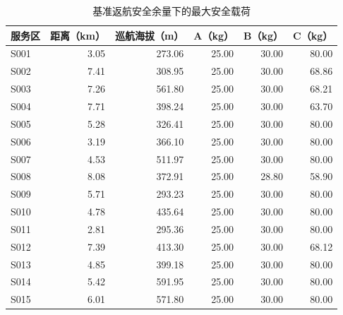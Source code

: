 \begin{table}[!htbp]
\centering
\caption{基准返航安全余量下的最大安全载荷}
\label{tab:q1-payload}
\small
\setlength{\tabcolsep}{4pt}
\renewcommand{\arraystretch}{1.10}
\begin{tabular}{@{}lrrrrr@{}}
\toprule
服务区 & 距离（km） & 巡航海拔（m） & A（kg） & B（kg） & C（kg） \\
\midrule
S001 & 3.05 & 273.06 & 25.00 & 30.00 & 80.00 \\
S002 & 7.41 & 308.95 & 25.00 & 30.00 & 68.86 \\
S003 & 7.26 & 561.80 & 25.00 & 30.00 & 68.21 \\
S004 & 7.71 & 398.24 & 25.00 & 30.00 & 63.70 \\
S005 & 5.28 & 326.41 & 25.00 & 30.00 & 80.00 \\
S006 & 3.19 & 366.10 & 25.00 & 30.00 & 80.00 \\
S007 & 4.53 & 511.97 & 25.00 & 30.00 & 80.00 \\
S008 & 8.08 & 372.91 & 25.00 & 28.80 & 58.90 \\
S009 & 5.71 & 293.23 & 25.00 & 30.00 & 80.00 \\
S010 & 4.78 & 435.64 & 25.00 & 30.00 & 80.00 \\
S011 & 2.81 & 295.36 & 25.00 & 30.00 & 80.00 \\
S012 & 7.39 & 413.30 & 25.00 & 30.00 & 68.12 \\
S013 & 4.85 & 399.18 & 25.00 & 30.00 & 80.00 \\
S014 & 5.42 & 591.95 & 25.00 & 30.00 & 80.00 \\
S015 & 6.01 & 571.80 & 25.00 & 30.00 & 80.00 \\
\bottomrule
\end{tabular}
\par{}
\end{table}
